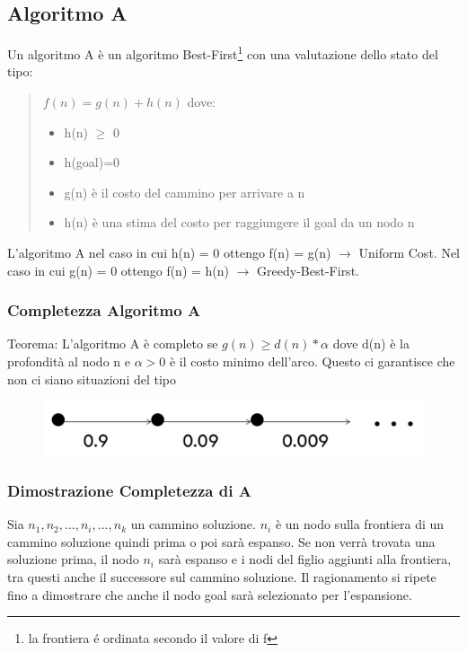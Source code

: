 \documentclass{article}
\begin{document}
\subsection{Algoritmo A}
Un algoritmo A è un algoritmo Best-First\footnote{la frontiera é ordinata secondo il valore di f} con una valutazione dello stato del tipo:
\begin{quote}
    $f(n) = g(n) + h(n) $ dove:
    \begin{itemize}
        \item h(n) $\geq$ 0
        \item h(goal)=0
        \item g(n) è il costo del cammino per arrivare a n
        \item h(n) è una stima del costo per raggiungere il goal da un nodo n
    \end{itemize}
\end{quote}
L'algoritmo A nel caso in cui h(n) = 0 ottengo f(n) = g(n) $\rightarrow$ Uniform Cost. \newline
Nel caso in cui g(n) = 0 ottengo f(n) = h(n) $\rightarrow$ Greedy-Best-First.

\subsubsection{Completezza Algoritmo A}
Teorema: L'algoritmo A è completo se $g(n) \geq d(n)*\alpha$ dove d(n) è la profondità al nodo n e $\alpha > 0$ è il costo minimo dell'arco. Questo ci garantisce che non ci siano situazioni del tipo 
\begin{figure}[H]
    \centering
    \includegraphics[scale=0.3]{Images/completezzaA.png}
\end{figure}

\subsubsection{Dimostrazione Completezza di A}
Sia $n_1, n_2, ..., n_i, ..., n_k$ un cammino soluzione. \newline
$n_i$ è un nodo sulla frontiera di un cammino soluzione quindi prima o poi sarà espanso. \newline
Se non verrà trovata una soluzione prima, il nodo $n_i$ sarà espanso e i nodi del figlio aggiunti alla frontiera, tra questi anche il successore sul cammino soluzione. Il ragionamento si ripete fino a dimostrare che anche il nodo goal sarà selezionato per l'espansione.
\end{document}
